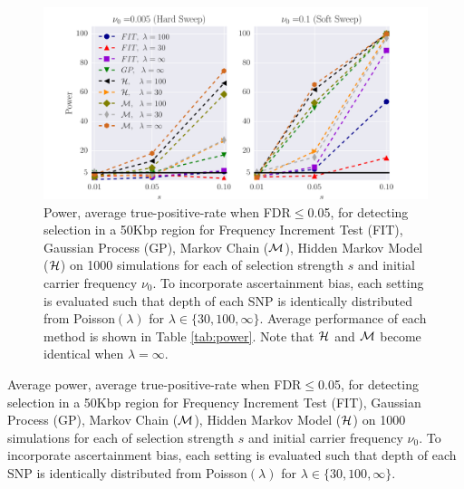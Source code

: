 \documentclass[11pt]{article}
\begin{document}
\begin{figure}[H]
	\centering
	\includegraphics[trim=0.4in 0 .8in 0.2in , clip,width=\textwidth]{figures/power.pdf}
	\caption{Power, average true-positive-rate when FDR$\le$0.05, for detecting selection in a 50Kbp region for Frequency Increment Test (FIT), Gaussian Process (GP), Markov Chain (${\cal M}$), Hidden Markov Model (${\cal H}$) on 1000 
		simulations for each of selection strength $s$ and initial 
		carrier frequency $\nu_0$. To incorporate ascertainment bias, each setting is evaluated such that depth of each SNP is identically distributed from Poisson$(\lambda)$ for $\lambda \in \{30,100,\infty\}$. Average performance of each method is shown in Table \ref{tab:power}. Note that ${\cal H}$ and ${\cal M}$ become identical when $\lambda=\infty$.  } \label{fig:power}
\end{figure}
\begin{table}[h]
	
	\caption{Average power, average true-positive-rate when FDR$\le$0.05, for detecting selection in a 50Kbp region for Frequency Increment Test (FIT), Gaussian Process (GP), Markov Chain (${\cal M}$), Hidden Markov Model (${\cal H}$) on 1000 
		simulations for each of selection strength $s$ and initial 
		carrier frequency $\nu_0$. To incorporate ascertainment bias, each setting is evaluated such that depth of each SNP is identically distributed from Poisson$(\lambda)$ for $\lambda \in \{30,100,\infty\}$.}\label{tab:power}
\end{table}
\newpage
\end{document}
